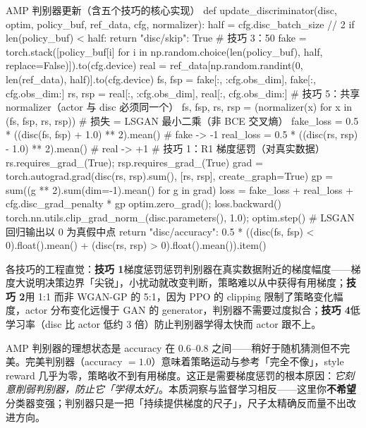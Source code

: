 \begin{codebox}[Python]{AMP 判别器更新（含五个技巧的核心实现）}
def update_discriminator(disc, optim, policy_buf, ref_data, cfg, normalizer):
    half = cfg.disc_batch_size // 2
    if len(policy_buf) < half:
        return {"disc/skip": True}
    # 技巧 3：50%
    fake = torch.stack([policy_buf[i] for i in
        np.random.choice(len(policy_buf), half, replace=False)]).to(cfg.device)
    real = ref_data[np.random.randint(0, len(ref_data), half)].to(cfg.device)
    fs, fsp = fake[:, :cfg.obs_dim], fake[:, cfg.obs_dim:]
    rs, rsp = real[:, :cfg.obs_dim], real[:, cfg.obs_dim:]
    # 技巧 5：共享 normalizer（actor 与 disc 必须同一个）
    fs, fsp, rs, rsp = (normalizer(x) for x in (fs, fsp, rs, rsp))
    # 损失 = LSGAN 最小二乘（非 BCE 交叉熵）
    fake_loss = 0.5 * ((disc(fs, fsp) + 1.0) ** 2).mean()   # fake -> -1
    real_loss = 0.5 * ((disc(rs, rsp) - 1.0) ** 2).mean()   # real -> +1
    # 技巧 1：R1 梯度惩罚（对真实数据）
    rs.requires_grad_(True); rsp.requires_grad_(True)
    grad = torch.autograd.grad(disc(rs, rsp).sum(), [rs, rsp],
                               create_graph=True)
    gp = sum((g ** 2).sum(dim=-1).mean() for g in grad)
    loss = fake_loss + real_loss + cfg.disc_grad_penalty * gp
    optim.zero_grad(); loss.backward()
    torch.nn.utils.clip_grad_norm_(disc.parameters(), 1.0); optim.step()
    # LSGAN 回归输出以 0 为真假中点
    return {"disc/accuracy":
            0.5 * ((disc(fs, fsp) < 0).float().mean()
                   + (disc(rs, rsp) > 0).float().mean()).item()}
\end{codebox}

各技巧的工程直觉：\textbf{技巧 1}梯度惩罚惩罚判别器在真实数据附近的梯度幅度——梯度大说明决策边界「尖锐」，小扰动就改变判断，策略难以从中获得有用梯度；\textbf{技巧 2}用 1:1 而非 WGAN-GP 的 5:1，因为 PPO 的 clipping 限制了策略变化幅度，actor 分布变化远慢于 GAN 的 generator，判别器不需要过度拟合；\textbf{技巧 4}低学习率（disc 比 actor 低约 3 倍）防止判别器学得太快而 actor 跟不上。

\begin{insight}\label{ins:rlmc-imit-discsweet}
AMP 判别器的理想状态是 accuracy 在 0.6--0.8 之间——稍好于随机猜测但不完美。完美判别器（accuracy $=1.0$）意味着策略运动与参考「完全不像」，style reward 几乎为零，策略收不到有用梯度。这正是需要梯度惩罚的根本原因：\emph{它刻意削弱判别器，防止它「学得太好」}。本质洞察与监督学习相反——这里你\textbf{不希望}分类器变强；判别器只是一把「持续提供梯度的尺子」，尺子太精确反而量不出改进方向。
\end{insight}

